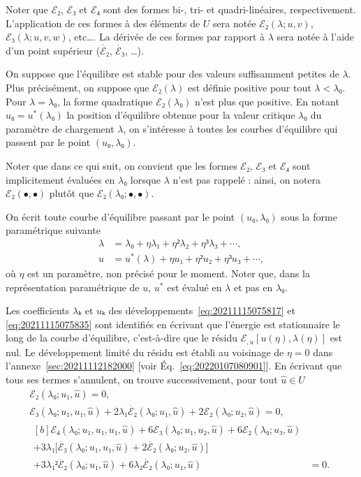 \documentclass[12pt, final]{amsart}
\begin{document}
Noter que \(ℰ₂\), \(ℰ₃\) et \(ℰ₄\) sont des formes bi-, tri- et quadri-linéaires,
respectivement. L'application de ces formes à des éléments de \(U\) sera notée
\(ℰ₂(λ; u, v)\), \(ℰ₃(λ; u, v, w)\), etc\dots. La dérivée de ces formes par
rapport à \(λ\) sera notée à l'aide d'un point supérieur (\(\dot{ℰ₂}\),
\(\dot{ℰ₃}\), \dots).

On suppose que l'équilibre est stable pour des valeurs suffisamment petites de
\(λ\). Plus précisément, on suppose que \(ℰ₂(λ)\) est définie positive pour tout
\(λ<λ₀\). Pour \(λ=λ₀\), la forme quadratique \(ℰ₂(λ₀)\) n'est plus que
positive. En notant \(u₀=u^*(λ₀)\) la position d'équilibre obtenue pour la
valeur critique \(λ₀\) du paramètre de chargement \(λ\), on s'intéresse à
toutes les courbes d'équilibre qui passent par le point \((u₀, λ₀)\).

Noter que dans ce qui suit, on convient que les formes \(ℰ₂\), \(ℰ₃\) et \(ℰ₄\)
sont implicitement évaluées en \(λ₀\) lorsque \(λ\) n'est pas rappelé : ainsi,
on notera \(ℰ₂(•, •)\) plutôt que \(ℰ₂(λ₀; •, •)\).

On écrit toute courbe d'équilibre passant par le point \((u₀, λ₀)\) sous la
forme paramétrique suivante
\begin{align}
  \label{eq:20211115075817}
  λ&=λ₀+ηλ₁+η²λ₂+η³λ₃+\cdots,\\
  \label{eq:20211115075835}
  u&=u^*(λ)+η u₁+η² u₂+η³u₃+\cdots,
\end{align}
où \(η\) est un paramètre, non précisé pour le moment. Noter que, dans la
représentation paramétrique de \(u\), \(u^*\) est évalué en \(λ\) et pas en
\(λ₀\).

Les coefficients \(λ ₖ\) et \(uₖ\) des développements~\eqref{eq:20211115075817}
et \eqref{eq:20211115075835} sont identifiés en écrivant que l'énergie est
stationnaire le long de la courbe d'équilibre, c'est-à-dire que le résidu
\(ℰ_{,u}[u(η), λ(η)]\) est nul. Le développement limité du résidu est établi au
voisinage de \(η=0\) dans l'annexe~\ref{sec:20211112182000} [voir
Éq.~\eqref{eq:20220107080901}]. En écrivant que tous ses termes s'annulent, on
trouve successivement, pour tout \(\hat{u}∈ U\)
\begin{gather}
  \label{eq:20211112182917}
  ℰ₂(λ₀; u₁, \hat{u})=0,\\
  \label{eq:20211112183220}
  ℰ₃(λ₀; u₁, u₁, \hat{u})+2λ₁\dot{ℰ₂}(λ₀; u₁, \hat{u})+2ℰ₂(λ₀; u₂, \hat{u})=0,\\
  \label{eq:20220114135717}
  \begin{aligned}[b]
    ℰ₄(λ₀; u₁, u₁, u₁, \hat{u})+6ℰ₃(λ₀; u₁, u₂, \hat{u})+6ℰ₂(λ₀; u₃, \hat{u})&\\
    +3λ₁\bigl[\dot{ℰ₃}(λ₀; u₁, u₁, \hat{u})+2\dot{ℰ₂}(λ₀; u₂, \hat{u})\bigr]&\\
    +3λ₁²\ddot{ℰ₂}(λ₀; u₁, \hat{u})
    +6λ₂\dot{ℰ₂}(λ₀; u₁, \hat{u})&=0.
  \end{aligned}
\end{gather}
\end{document}
